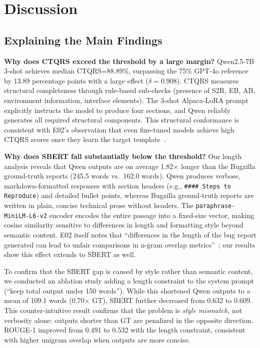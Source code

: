 
\section{Discussion}
\label{sec:discussion}

\subsection{Explaining the Main Findings}

\textbf{Why does CTQRS exceed the threshold by a large margin?}
Qwen2.5-7B 3-shot achieves median CTQRS=88.89\%, surpassing
the 75\% GPT-4o reference by 13.89 percentage points with a
large effect ($\delta=0.908$). CTQRS measures structural
completeness through rule-based sub-checks (presence of S2R,
EB, AB, environment information, interface elements). The
3-shot Alpaca-LoRA prompt explicitly instructs the model to
produce four sections, and Qwen reliably generates all required
structural components. This structural conformance is consistent
with E02's observation that even fine-tuned models achieve
high CTQRS scores once they learn the target
template~\cite{acharya2025bugquality}.

\textbf{Why does SBERT fall substantially below the threshold?}
Our length analysis reveals that Qwen outputs are on average
1.82$\times$ longer than the Bugzilla ground-truth reports
(245.5 words vs.\ 162.0 words). Qwen produces verbose,
markdown-formatted responses with section headers (e.g.,
\texttt{\#\#\#\# Steps to Reproduce}) and detailed bullet
points, whereas Bugzilla ground-truth reports are written in
plain, concise technical prose without headers. The
\texttt{paraphrase-MiniLM-L6-v2} encoder encodes the entire
passage into a fixed-size vector, making cosine similarity
sensitive to differences in length and formatting style
beyond semantic content. E02 itself notes that ``differences
in the length of the bug report generated can lead to unfair
comparisons in n-gram overlap
metrics''~\cite{acharya2025bugquality}; our results show
this effect extends to SBERT as well.

To confirm that the SBERT gap is caused by style rather than
semantic content, we conducted an ablation study adding a
length constraint to the system prompt (``keep total output
under 150 words''). While this shortened Qwen outputs to a
mean of 109.1 words (0.70$\times$ GT), SBERT further
decreased from 0.632 to 0.609. This counter-intuitive
result confirms that the problem is \emph{style mismatch},
not verbosity alone: outputs shorter than GT are penalized
in the opposite direction. ROUGE-1 improved from 0.491 to
0.532 with the length constraint, consistent with higher
unigram overlap when outputs are more concise.

